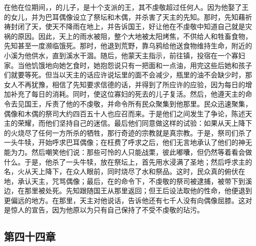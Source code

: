 在他在位期间，，的儿子，是十个支派的王，其不虔敬超过任何人。因为他娶了王的女儿，并为巴耳偶像设立了祭坛和木偶，并杀害了天主的先知。那时，先知藉祈祷封闭了天，使天不降雨在地上，并告诉国王，好让他在不虔敬中知道自己就是灾祸的原因。因此，天上的雨水被阻，整个大地被太阳烤焦，不供给人和牲畜食物，先知甚至一度濒临饿死。那时，他退到荒野，靠乌鸦给他送食物维持生命，附近的小溪为他供水，直到溪水干涸。随后，他蒙天主指示，前往镇，投宿在一个寡妇家。当他饥饿地向她乞食时，她抱怨说只有一把面和一点油，用完这些后她和孩子们就要等死。但当以天主的话应许说坛里的面不会减少，瓶里的油不会缺少时，那女人不再犹豫，相信了先知要求信德的话，并得到了所应许的应验，因为每日的增加补充了每日的消耗。同时，使这位寡妇的死去的儿子复活。然后，他遵天主的命令去见国王，斥责了他的不虔敬，并命令所有民众聚集到他那里。民众迅速聚集，偶像和木偶的祭司大约四百五十人也应召而来。于是他们之间发生了争论，陈述天主的荣耀，而他们坚持自己的迷信。最后他们同意做这样的试验：如果从天上降下的火烧尽了任何一方所杀的牺牲，那行奇迹的宗教就是真宗教。于是，祭司们杀了一头牛犊，开始呼求巴耳偶像；在枉费了呼求之后，他们无言地承认了他们的神无能为力。然后嘲笑他们说：那些可怜的人只能战栗，彼此嘟囔，但仍然等着看会做什么。于是，他杀了一头牛犊，放在祭坛上，首先用水浸满了圣地；然后呼求主的名，火从天上降下，在众人眼前，同时烧尽了水和祭品。这时，民众真的俯伏在地，承认天主，咒骂偶像；最后，在的命令下，不虔敬的祭司被逮捕，被带下到溪边，在那里被处死。先知跟随国王从那里返回；但王后设法取他的性命，他便退到更偏远的地方。在那里，天主对他说话，告诉他还有七千人没有向偶像屈膝。这对是惊人的宣告，因为他原以为只有自己保持了不受不虔敬的玷污。\par


\subsection{第四十四章}

